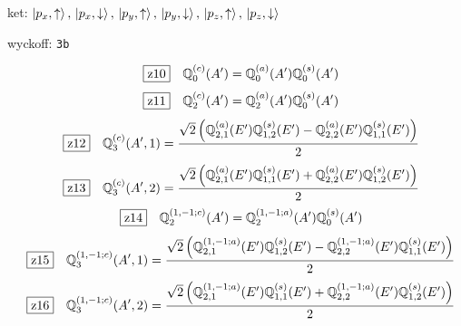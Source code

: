\documentclass[fleqn,10pt,landscape]{jsarticle}
\begin{document}
\noindent\quad * ket: $\ket{p_{x},\uparrow},\, \ket{p_{x},\downarrow},\, \ket{p_{y},\uparrow},\, \ket{p_{y},\downarrow},\, \ket{p_{z},\uparrow},\, \ket{p_{z},\downarrow}$

\noindent\quad * wyckoff: \texttt{3b}

\begin{dmath*}
\hspace*{3mm}\fbox{z10}\quad \mathbb{Q}_{0}^{(c)}(A^{\prime})=\mathbb{Q}_{0}^{(a)}(A^{\prime}) \mathbb{Q}_{0}^{(s)}(A^{\prime})
\end{dmath*}
\begin{dmath*}
\hspace*{3mm}\fbox{z11}\quad \mathbb{Q}_{2}^{(c)}(A^{\prime})=\mathbb{Q}_{2}^{(a)}(A^{\prime}) \mathbb{Q}_{0}^{(s)}(A^{\prime})
\end{dmath*}
\begin{dmath*}
\hspace*{3mm}\fbox{z12}\quad \mathbb{Q}_{3}^{(c)}(A^{\prime},1)=\frac{\sqrt{2} \left(\mathbb{Q}_{2,1}^{(a)}(E^{\prime}) \mathbb{Q}_{1,2}^{(s)}(E^{\prime}) - \mathbb{Q}_{2,2}^{(a)}(E^{\prime}) \mathbb{Q}_{1,1}^{(s)}(E^{\prime})\right)}{2}
\end{dmath*}
\begin{dmath*}
\hspace*{3mm}\fbox{z13}\quad \mathbb{Q}_{3}^{(c)}(A^{\prime},2)=\frac{\sqrt{2} \left(\mathbb{Q}_{2,1}^{(a)}(E^{\prime}) \mathbb{Q}_{1,1}^{(s)}(E^{\prime}) + \mathbb{Q}_{2,2}^{(a)}(E^{\prime}) \mathbb{Q}_{1,2}^{(s)}(E^{\prime})\right)}{2}
\end{dmath*}
\begin{dmath*}
\hspace*{3mm}\fbox{z14}\quad \mathbb{Q}_{2}^{(1,-1;c)}(A^{\prime})=\mathbb{Q}_{2}^{(1,-1;a)}(A^{\prime}) \mathbb{Q}_{0}^{(s)}(A^{\prime})
\end{dmath*}
\begin{dmath*}
\hspace*{3mm}\fbox{z15}\quad \mathbb{Q}_{3}^{(1,-1;c)}(A^{\prime},1)=\frac{\sqrt{2} \left(\mathbb{Q}_{2,1}^{(1,-1;a)}(E^{\prime}) \mathbb{Q}_{1,2}^{(s)}(E^{\prime}) - \mathbb{Q}_{2,2}^{(1,-1;a)}(E^{\prime}) \mathbb{Q}_{1,1}^{(s)}(E^{\prime})\right)}{2}
\end{dmath*}
\begin{dmath*}
\hspace*{3mm}\fbox{z16}\quad \mathbb{Q}_{3}^{(1,-1;c)}(A^{\prime},2)=\frac{\sqrt{2} \left(\mathbb{Q}_{2,1}^{(1,-1;a)}(E^{\prime}) \mathbb{Q}_{1,1}^{(s)}(E^{\prime}) + \mathbb{Q}_{2,2}^{(1,-1;a)}(E^{\prime}) \mathbb{Q}_{1,2}^{(s)}(E^{\prime})\right)}{2}
\end{dmath*}
\end{document}
